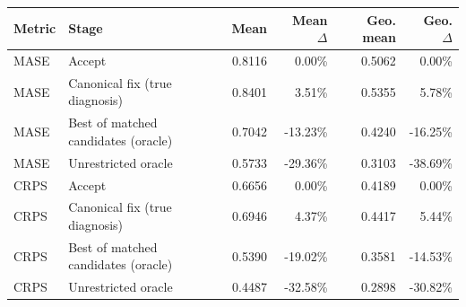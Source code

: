 \begin{tabular}{llrrrr}
\toprule
Metric & Stage & Mean & Mean $\Delta$ & Geo. mean & Geo. $\Delta$ \\
\midrule
MASE & Accept & 0.8116 & 0.00\% & 0.5062 & 0.00\% \\
MASE & Canonical fix (true diagnosis) & 0.8401 & 3.51\% & 0.5355 & 5.78\% \\
MASE & Best of matched candidates (oracle) & 0.7042 & -13.23\% & 0.4240 & -16.25\% \\
MASE & Unrestricted oracle & 0.5733 & -29.36\% & 0.3103 & -38.69\% \\
CRPS & Accept & 0.6656 & 0.00\% & 0.4189 & 0.00\% \\
CRPS & Canonical fix (true diagnosis) & 0.6946 & 4.37\% & 0.4417 & 5.44\% \\
CRPS & Best of matched candidates (oracle) & 0.5390 & -19.02\% & 0.3581 & -14.53\% \\
CRPS & Unrestricted oracle & 0.4487 & -32.58\% & 0.2898 & -30.82\% \\
\bottomrule
\end{tabular}
